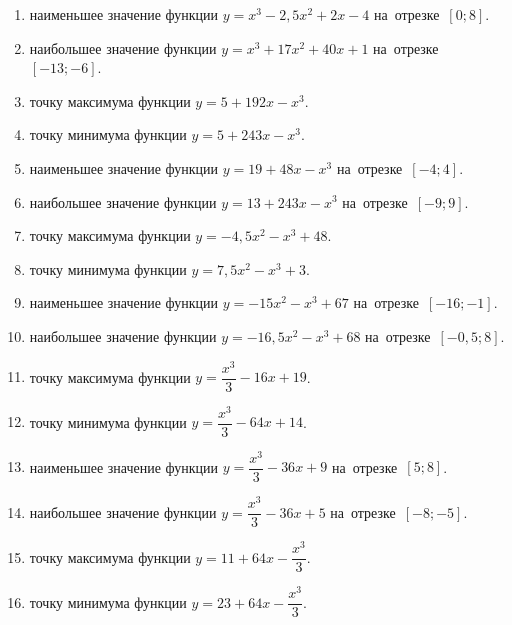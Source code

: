 \documentclass[a4paper,10pt]{article}
\begin{document}
\begin{enumerate}
\item {} наименьшее значение функции $y=x^3 -2,5x^2+2x-4$ на~отрезке~$\left[0;8\right]$.

\item {} наибольшее значение функции $y=x^3 +17x^2+40x+1$ на~отрезке~$\left[-13;-6\right]$.

\item {} точку максимума функции $y=5+192x-x^3$.

\item {} точку минимума функции $y=5+243x-x^3$.

\item {} наименьшее значение функции $y=19+48x-x^3$ на~отрезке~$\left[-4;4\right]$.

\item {} наибольшее значение функции $y=13+243x-x^3$ на~отрезке~$\left[-9;9\right]$.

\item {} точку максимума функции $y=-4,5x^2-x^3+48$.

\item {} точку минимума функции $y=7,5x^2-x^3+3$.

\item {} наименьшее значение функции $y=-15x^2-x^3+67$ на~отрезке~$\left[-16;-1\right]$.

\item {} наибольшее значение функции $y=-16,5x^2-x^3+68$ на~отрезке~$\left[-0,5;8\right]$.

\item {} точку максимума функции $y=\dfrac{x^3}{3} -16x+19$.

\item {} точку минимума функции $y=\dfrac{x^3}{3} -64x+14$.

\item {} наименьшее значение функции $y=\dfrac{x^3}{3} -36x+9$ на~отрезке~$\left[5;8\right]$.

\item {} наибольшее значение функции $y=\dfrac{x^3}{3} -36x+5$ на~отрезке~$\left[-8;-5\right]$.

\item {} точку максимума функции $y=11 +64x-\dfrac{x^3}{3}$.

\item {} точку минимума функции $y=23 +64x-\dfrac{x^3}{3}$.


\end{enumerate}
\end{document}
